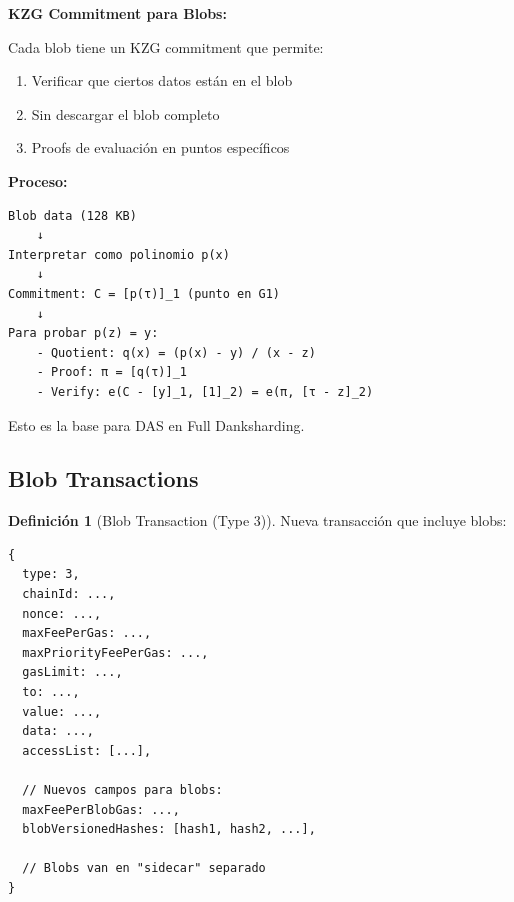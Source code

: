 \documentclass[11pt,a4paper,twoside,openright]{book}
\theoremstyle{definition}
\newtheorem{definition}{Definición}[chapter]
\theoremstyle{plain}
\theoremstyle{remark}
\begin{document}
\begin{mathnote}
\textbf{KZG Commitment para Blobs:}

Cada blob tiene un KZG commitment que permite:
\begin{enumerate}
    \item Verificar que ciertos datos están en el blob
    \item Sin descargar el blob completo
    \item Proofs de evaluación en puntos específicos
\end{enumerate}

\textbf{Proceso:}
\begin{verbatim}
Blob data (128 KB)
    ↓
Interpretar como polinomio p(x)
    ↓
Commitment: C = [p(τ)]_1 (punto en G1)
    ↓
Para probar p(z) = y:
    - Quotient: q(x) = (p(x) - y) / (x - z)
    - Proof: π = [q(τ)]_1
    - Verify: e(C - [y]_1, [1]_2) = e(π, [τ - z]_2)
\end{verbatim}

Esto es la base para DAS en Full Danksharding.
\end{mathnote}

\subsection{Blob Transactions}

\begin{definition}[Blob Transaction (Type 3)]
Nueva transacción que incluye blobs:

\begin{verbatim}
{
  type: 3,
  chainId: ...,
  nonce: ...,
  maxFeePerGas: ...,
  maxPriorityFeePerGas: ...,
  gasLimit: ...,
  to: ...,
  value: ...,
  data: ...,
  accessList: [...],
  
  // Nuevos campos para blobs:
  maxFeePerBlobGas: ...,
  blobVersionedHashes: [hash1, hash2, ...],
  
  // Blobs van en "sidecar" separado
}
\end{verbatim}
\end{definition}
\end{document}
